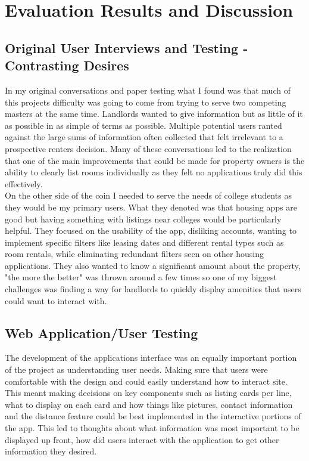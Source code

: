 \documentclass[10pt,twocolumn]{article}
\begin{document}
\section{Evaluation Results and Discussion}
\subsection{Original User Interviews and Testing - Contrasting Desires}
In my original conversations and paper testing what I found was that much of this projects difficulty was going to come from trying to serve two competing masters at the same time. Landlords wanted to give information but as little of it as possible in as simple of terms as possible. Multiple potential users ranted against the large sums of information often collected that felt irrelevant to a prospective renters decision. Many of these conversations led to the realization that one of the main improvements that could be made for property owners is the ability to clearly list rooms individually as they felt no applications truly did this effectively.\\

On the other side of the coin I needed to serve the needs of college students as they would be my primary users. What they denoted was that housing apps are good but having something with listings near colleges would be particularly helpful. They focused on the usability of the app, disliking accounts, wanting to implement specific filters like leasing dates and different rental types such as room rentals, while eliminating redundant filters seen on other housing applications. They also wanted to know a significant amount about the property, "the more the better" was thrown around a few times so one of my biggest challenges was finding a way for landlords to quickly display amenities that users could want to interact with. 
\subsection{Web Application/User Testing}
The development of the applications interface was an equally important portion of the project as understanding user needs. Making sure that users were comfortable with the design and could easily understand how to interact site. This meant making decisions on key components such as listing cards per line, what to display on each card and how things like pictures, contact information and the distance feature could be best implemented in the interactive portions of the app. This led to thoughts about what information was most important to be displayed up front, how did users interact with the application to get other information they desired. 
\end{document}
